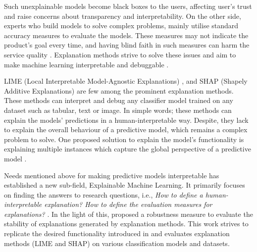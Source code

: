 \documentclass[english]{tktltiki2}
\theoremstyle{definition}
\theoremstyle{remark}
\begin{document}
Such unexplainable models become black boxes to the users, affecting user's trust and raise concerns about transparency and interpretability.
On the other side, experts who build models to solve complex problems, mainly utilise standard accuracy measures to evaluate the models. These measures may not indicate the product's goal every time, and having blind faith in such measures can harm the service quality \citep{lipton2016mythos, guidotti2018survey}. Explanation methods strive to solve these issues and aim to make machine learning interpretable and debuggable \citep{guidotti2018survey}.

LIME (Local Interpretable Model-Agnostic Explanations) \citep{ribeiro2016should}, and SHAP (Shapely Additive Explanations) \citep{lundberg2017unified} are few among the prominent explanation methods. These methods can interpret and debug any classifier model trained on any dataset such as tabular, text or image. In simple words; these methods can explain the models' predictions in a human-interpretable way. Despite, they lack to explain the overall behaviour of a predictive model, which remains a complex problem to solve. One proposed solution to explain the model's functionality is explaining multiple instances which capture the global perspective of a predictive model \citep{ribeiro2016should}.


Needs mentioned above for making predictive models interpretable has established a new sub-field, Explainable Machine Learning. It primarily focuses on finding the answers to research questions, i.e., \textit{How to define a human-interpretable explanation? How to define the evaluation measures for explanations?} \citep{adhikari2018example, honegger2018shedding}. In the light of this, \citet{alvarez2018robustness} proposed a robustness measure to evaluate the stability of explanations generated by explanation methods. This work strives to replicate the desired functionality introduced in \citep{alvarez2018robustness} and evaluates explanation methods (LIME and SHAP) on various classification models and datasets.

%
\end{document}
